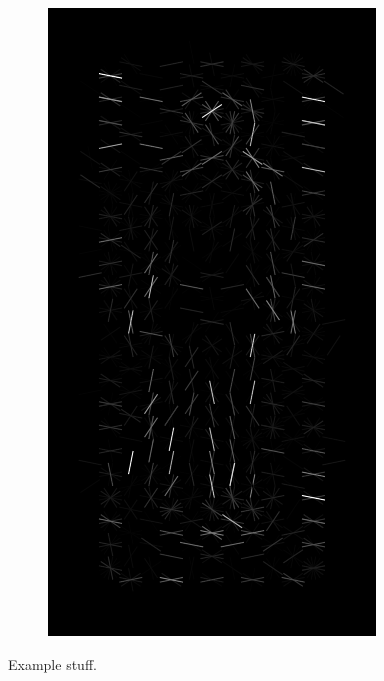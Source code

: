\documentclass[thesis.tex]{subfiles}
\begin{document}
\begin{figure}
\begin{subfigure}[t]{0.3\textwidth}
		\includegraphics[width=\textwidth]{img/inriaExampleDescriptorSvm.pdf}
		\caption{}
		\label{fig:inriaExampleDescriptorSvm}
		\vspace{2mm}
	\end{subfigure}
	\caption{Example stuff.}
	\label{fig:imageCorrespondenceCurves}
\end{figure}
\end{document}
